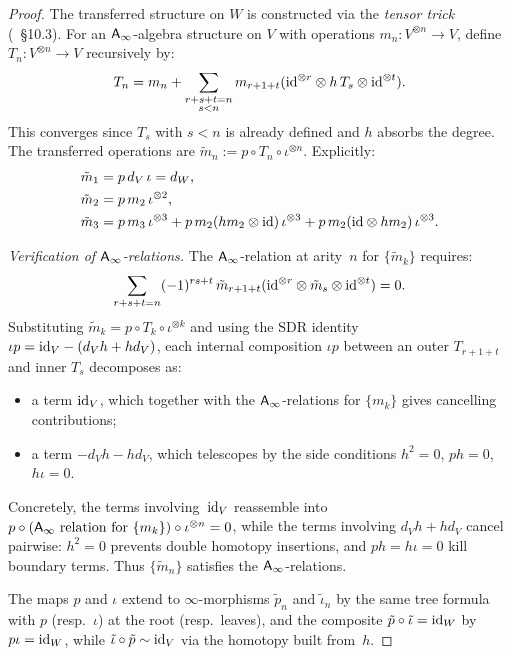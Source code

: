 \begin{proof}
The transferred structure on $W$ is constructed via the \emph{tensor trick}
(\cite{LodayVallette}~\S10.3).
For an $\mathsf{A}_{\infty}$-algebra structure on $V$ with operations $m_n: V^{\otimes n} \to V$,
define $T_n: V^{\otimes n} \to V$ recursively by:
\[
T_n = m_n + \sum_{\substack{r+s+t = n \\ s < n}} m_{r+1+t}(\mathrm{id}^{\otimes r} \otimes h\, T_s \otimes \mathrm{id}^{\otimes t}).
\]
This converges since $T_s$ with $s < n$ is already defined and $h$ absorbs
the degree.  The transferred operations are $\tilde{m}_n := p \circ T_n \circ
\iota^{\otimes n}$.  Explicitly:
\begin{align*}
\tilde{m}_1 &= p \, d_V \, \iota = d_W, \\
\tilde{m}_2 &= p \, m_2 \, \iota^{\otimes 2}, \\
\tilde{m}_3 &= p \, m_3 \, \iota^{\otimes 3} + p \, m_2 (h m_2 \otimes \mathrm{id}) \, \iota^{\otimes 3}
              + p \, m_2 (\mathrm{id} \otimes h m_2) \, \iota^{\otimes 3}.
\end{align*}

\emph{Verification of $\mathsf{A}_{\infty}$-relations.}
The $\mathsf{A}_{\infty}$-relation at arity~$n$ for $\{\tilde{m}_k\}$ requires:
\begin{equation}\label{eq:ainfty-relation}
\sum_{\substack{r+s+t=n}} (-1)^{rs+t}\, \tilde{m}_{r+1+t}(\mathrm{id}^{\otimes r} \otimes \tilde{m}_s \otimes \mathrm{id}^{\otimes t}) = 0.
\end{equation}
Substituting $\tilde{m}_k = p \circ T_k \circ \iota^{\otimes k}$ and using the
SDR identity $\iota p = \mathrm{id}_V - (d_V h + h d_V)$, each internal composition
$\iota p$ between an outer $T_{r+1+t}$ and inner $T_s$ decomposes as:
\begin{itemize}
\item a term $\mathrm{id}_V$, which together with the $\mathsf{A}_{\infty}$-relations for $\{m_k\}$
  gives cancelling contributions;
\item a term $-d_V h - h d_V$, which telescopes by the side conditions
  $h^2 = 0$, $p h = 0$, $h \iota = 0$.
\end{itemize}
Concretely, the terms involving~$\mathrm{id}_V$ reassemble into $p \circ (\text{$\mathsf{A}_{\infty}$
relation for } \{m_k\}) \circ \iota^{\otimes n} = 0$, while the terms
involving $d_V h + h d_V$ cancel pairwise: $h^2 = 0$ prevents double
homotopy insertions, and $ph = h\iota = 0$ kill boundary terms.  Thus
$\{\tilde{m}_n\}$ satisfies the $\mathsf{A}_{\infty}$-relations.

The maps $p$ and $\iota$ extend to $\infty$-morphisms $\tilde{p}_n$ and
$\tilde{\iota}_n$ by the same tree formula with $p$ (resp.~$\iota$) at
the root (resp.~leaves), and the composite $\tilde{p} \circ \tilde{\iota}
= \mathrm{id}_W$ by $p\iota = \mathrm{id}_W$, while $\tilde{\iota} \circ \tilde{p}
\sim \mathrm{id}_V$ via the homotopy built from~$h$.
\end{proof}


